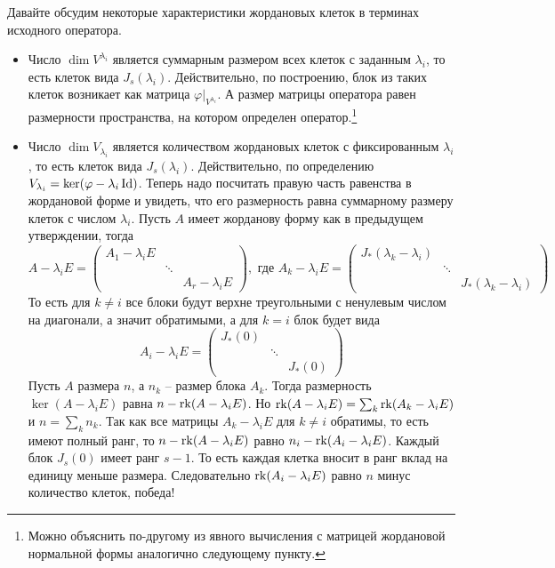 Давайте обсудим некоторые характеристики жордановых клеток в терминах исходного оператора.
\begin{itemize}
\item Число $\dim V^{\lambda_i}$ является суммарным размером всех клеток с заданным $\lambda_i$, то есть клеток вида $J_s(\lambda_i)$. Действительно, по построению, блок из таких клеток возникает как матрица $\varphi|_{V^{\lambda_i}}$. А размер матрицы оператора равен размерности пространства, на котором определен оператор.\footnote{Можно объяснить по-другому из явного вычисления с матрицей жордановой нормальной формы аналогично следующему пункту.}

\item Число $\dim V_{\lambda_i}$ является количеством жордановых клеток с фиксированным $\lambda_i$, то есть клеток вида $J_s(\lambda_i)$. Действительно, по определению $V_{\lambda_i} = \ker (\varphi - \lambda_i \operatorname{Id})$. Теперь надо посчитать правую часть равенства в жордановой форме и увидеть, что его размерность равна суммарному размеру клеток с числом $\lambda_i$. Пусть $A$ имеет жорданову форму как в предыдущем утверждении, тогда
\[
A -\lambda_i E= 
\begin{pmatrix}
{A_1-\lambda_i E}&{}&{}\\
{}&{\ddots}&{}\\
{}&{}&{A_r - \lambda_i E}
\end{pmatrix},\text{ где }
A_k -\lambda_i E=
\begin{pmatrix}
{J_*(\lambda_k - \lambda_i)}&{}&{}\\
{}&{\ddots}&{}\\
{}&{}&{J_*(\lambda_k - \lambda_i)}
\end{pmatrix}
\]
То есть для $k\neq i$ все блоки будут верхне треугольными с ненулевым числом на диагонали, а значит обратимыми, а для $k = i$ блок будет вида
\[
A_i -\lambda_i E=
\begin{pmatrix}
{J_*(0)}&{}&{}\\
{}&{\ddots}&{}\\
{}&{}&{J_*(0)}
\end{pmatrix}
\]
Пусть $A$ размера $n$, а $n_k$ -- размер блока $A_k$. Тогда размерность $\ker (A - \lambda_i E)$ равна $n - \operatorname{rk} (A - \lambda_i E)$. Но $\operatorname{rk} (A - \lambda_i E) = \sum_k \operatorname{rk} (A_k - \lambda_i E)$ и $n = \sum_k n_k$. Так как все матрицы $A_k - \lambda_i E$ для $k\neq i$ обратимы, то есть имеют полный ранг, то $n - \operatorname{rk} (A-\lambda_i E)$ равно $n_i - \operatorname{rk} (A_i - \lambda_iE)$. Каждый блок $J_s(0)$ имеет ранг $s-1$. То есть каждая клетка вносит в ранг вклад на единицу меньше размера. Следовательно $\operatorname{rk}(A_i -\lambda_i E)$ равно $n$ минус количество клеток, победа!


\end{itemize}
